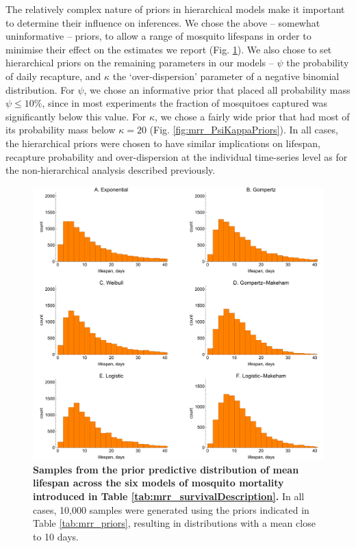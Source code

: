 \documentclass[12pt]{article}
\begin{document}
The relatively complex nature of priors in hierarchical models make it important to determine their influence on inferences. We chose the above -- somewhat uninformative -- priors, to allow a range of mosquito lifespans in order to minimise their effect on the estimates we report (Fig. \ref{fig:mrr_meanLifespanPrior}). We also chose to set hierarchical priors on the remaining parameters in our models -- $\psi$ the probability of daily recapture, and $\kappa$ the `over-dispersion' parameter of a negative binomial distribution. For $\psi$, we chose an informative prior that placed all probability mass $\psi\leq 10\%$, since in most experiments the fraction of mosquitoes captured was significantly below this value. For $\kappa$, we chose a fairly wide prior that had most of its probability mass below $\kappa=20$ (Fig. \ref{fig:mrr_PsiKappaPriors}). In all cases, the hierarchical priors were chosen to have similar implications on lifespan, recapture probability and over-dispersion at the individual time-series level as for the non-hierarchical analysis described previously.

\begin{figure}[h]
	\centerline{\includegraphics[width=1\textwidth]{./Figure_files/mrr_lifespan_priors.pdf}}
	\caption{\textbf{Samples from the prior predictive distribution of mean lifespan across the six models of mosquito mortality introduced in Table \ref{tab:mrr_survivalDescription}.} In all cases, 10,000 samples were generated using the priors indicated in Table \ref{tab:mrr_priors}, resulting in distributions with a mean close to 10 days.}
	\label{fig:mrr_meanLifespanPrior}
\end{figure}
\end{document}
